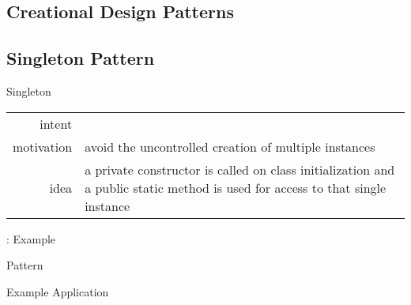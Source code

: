 \subsection{Creational Design Patterns}
\begin{frame}{\insertsubsection{} \mytitlesource{\gof}} %
	\centering{}
\end{frame}

\subsection{Singleton Pattern}
\begin{frame}{\insertsubsection} %
	\begin{fancycolumns}
		\begin{definition}{Singleton \mysource{\gofen}}
			\setlength\tabcolsep{1mm}
			\begin{tabularx}{\textwidth}{rX}				
				intent & \mycite{Ensure a class [has only] one instance, and provide a global point of access to it.}\\
				motivation & avoid the uncontrolled creation of multiple instances\\
				idea & a private constructor is called on class initialization and a public static method is used for access to that single instance
			\end{tabularx}
		\end{definition}
		\nextcolumn
		\centering{}
	\end{fancycolumns}
\end{frame}

\begin{frame}{\insertsubsection: Example} %
	\begin{fancycolumns}
		\begin{definitiontight}{Pattern}
			\centering\singleton{width=.5\linewidth}		
		\end{definitiontight}
		\nextcolumn
		\begin{exampletight}{Example Application}
			\centering\singletonexample{width=.5\linewidth}
		\end{exampletight}
	\end{fancycolumns}
\end{frame}


